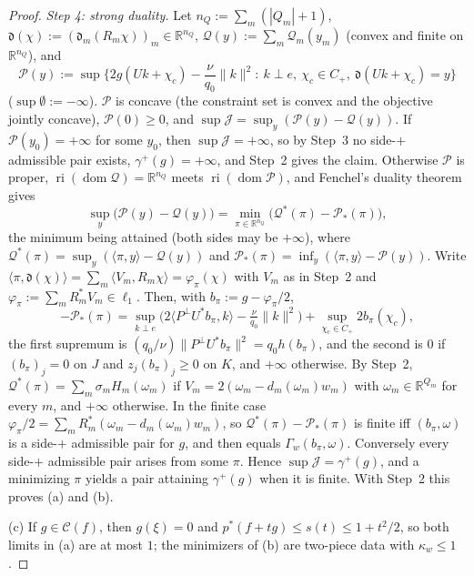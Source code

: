 \documentclass[10pt]{amsart}
\theoremstyle{definition}
\theoremstyle{remark}
\newcommand{\R}{\mathbb R}
\newcommand{\Cset}{\mathcal C}
\newcommand{\ip}[2]{\langle #1,#2\rangle}
\begin{document}
\begin{proof}
\emph{Step 4: strong duality.}  Let $n_Q:=\sum_m(|Q_m|+1)$,
$\mathfrak d(\chi):=(\mathfrak d_m(R_m\chi))_m\in\R^{n_Q}$,
$\mathcal Q(y):=\sum_m\mathcal Q_m(y_m)$ (convex and finite on $\R^{n_Q}$), and
\[
 \mathcal P(y):=\sup\Big\{2g(Uk+\chi_c)-\frac\nu{q_0}\|k\|^2:\ k\perp e,\ \chi_c\in
 C_+,\ \mathfrak d(Uk+\chi_c)=y\Big\}
\]
($\sup\emptyset:=-\infty$).
$\mathcal P$ is concave (the constraint set is convex and the objective jointly
concave), $\mathcal P(0)\ge0$, and $\sup\mathcal J=\sup_y(\mathcal P(y)-\mathcal Q(y))$.  If
$\mathcal P(y_0)=+\infty$ for some $y_0$, then $\sup\mathcal J=+\infty$, so by Step~3 no
side-$+$ admissible pair exists, $\gamma^+(g)=+\infty$, and Step~2 gives
the claim.  Otherwise $\mathcal P$ is proper, $\operatorname{ri}(\operatorname{dom}
\mathcal Q)=\R^{n_Q}$ meets $\operatorname{ri}(\operatorname{dom}\mathcal P)$, and
Fenchel's duality theorem \cite[Theorem~31.1]{Rockafellar} gives
\[
 \sup_y\big(\mathcal P(y)-\mathcal Q(y)\big)=\min_{\pi\in\R^{n_Q}}\big(\mathcal
 Q^*(\pi)-\mathcal P_*(\pi)\big),
\]
the minimum being attained (both sides may be $+\infty$), where $\mathcal
Q^*(\pi)=\sup_y(\ip\pi y-\mathcal Q(y))$ and $\mathcal P_*(\pi)=
\inf_y(\ip\pi y-\mathcal P(y))$.  Write $\ip{\pi}{\mathfrak d(\chi)}=
\sum_m\ip{V_m}{R_m\chi}=\varphi_\pi(\chi)$ with $V_m$ as in Step~2 and
$\varphi_\pi:=\sum_mR_m^*V_m\in\ell_1$.  Then, with
$b_\pi:=g-\varphi_\pi/2$,
\[
 -\mathcal P_*(\pi)=\sup_{k\perp e}\big(2\ip{P^\perp U^*b_\pi}{k}-\tfrac\nu{q_0}
 \|k\|^2\big)+\sup_{\chi_c\in C_+}2b_\pi(\chi_c),
\]
the first supremum is $(q_0/\nu)\|P^\perp U^*b_\pi\|^2=q_0h(b_\pi)$, and the
second is $0$ if $(b_\pi)_j=0$ on $J$ and $z_j(b_\pi)_j\ge0$ on $K$, and
$+\infty$ otherwise.  By Step~2, $\mathcal Q^*(\pi)=\sum_m\sigma_m
H_m(\omega_m)$ if $V_m=2(\omega_m-d_m(\omega_m)w_m)$ with $\omega_m\in
\R^{Q_m}$ for every $m$, and $+\infty$ otherwise.  In the finite case
$\varphi_\pi/2=\sum_mR_m^*(\omega_m-d_m(\omega_m)w_m)$, so
$\mathcal Q^*(\pi)-\mathcal P_*(\pi)$ is finite iff $(b_\pi,\omega)$ is a
side-$+$ admissible pair for $g$, and then equals $\Gamma_w(b_\pi,\omega)$.
Conversely every side-$+$ admissible pair arises from some $\pi$.
Hence $\sup\mathcal J=\gamma^+(g)$, and a minimizing $\pi$ yields a pair
attaining $\gamma^+(g)$ when it is finite.  With Step~2 this proves (a)
and (b).

(c) If $g\in\Cset(f)$, then $g(\xi)=0$ and $p^*(f+tg)\le s(t)\le1+t^2/2$, so
both limits in (a) are at most $1$; the minimizers of (b) are two-piece data
with $\kappa_w\le1$.
\end{proof}
\end{document}
